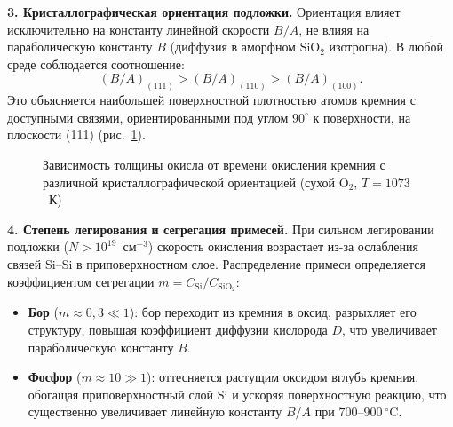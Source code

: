 \documentclass[12pt,a4paper]{article}
\theoremstyle{plain}
\theoremstyle{definition}
\theoremstyle{remark}
\numberwithin{equation}{section}
\begin{document}
\textbf{3. Кристаллографическая ориентация подложки.} Ориентация влияет исключительно на константу линейной скорости $B/A$, не влияя на параболическую константу $B$ (диффузия в аморфном $\mathrm{SiO}_2$ изотропна). В любой среде соблюдается соотношение:
\begin{equation}
    (B/A)_{(111)} > (B/A)_{(110)} > (B/A)_{(100)}.
\end{equation}
Это объясняется наибольшей поверхностной плотностью атомов кремния с доступными связями, ориентированными под углом $90^\circ$ к поверхности, на плоскости (111) (рис.~\ref{fig:orientation}).

\begin{figure}[H]
    \centering
    \caption{Зависимость толщины окисла от времени окисления кремния с различной кристаллографической ориентацией (сухой $\mathrm{O}_2$, $T = 1073$~К)}
    \label{fig:orientation}
\end{figure}

\textbf{4. Степень легирования и сегрегация примесей.} При сильном легировании подложки ($N > 10^{19}$~см$^{-3}$) скорость окисления возрастает из-за ослабления связей $\mathrm{Si}\text{--}\mathrm{Si}$ в приповерхностном слое. Распределение примеси определяется коэффициентом сегрегации $m = C_\text{Si} / C_{\mathrm{SiO}_2}$:
\begin{itemize}
    \item \textbf{Бор} ($m \approx 0{,}3 \ll 1$): бор переходит из кремния в оксид, разрыхляет его структуру, повышая коэффициент диффузии кислорода $D$, что увеличивает параболическую константу $B$.
    \item \textbf{Фосфор} ($m \approx 10 \gg 1$): оттесняется растущим оксидом вглубь кремния, обогащая приповерхностный слой $\mathrm{Si}$ и ускоряя поверхностную реакцию, что существенно увеличивает линейную константу $B/A$ при $700\text{--}900~^\circ\mathrm{C}$.
\end{itemize}
\end{document}

